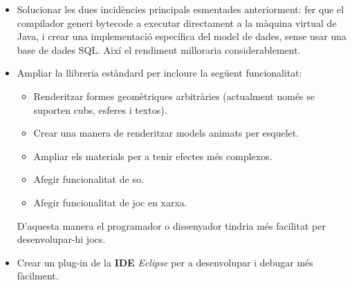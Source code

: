 \begin{itemize}
  \item Solucionar les dues incidències principals esmentades anteriorment: fer que el compilador generi bytecode a executar directament a la màquina virtual de Java, i crear una implementació específica del model de dades, sense usar una base de dades SQL. Així el rendiment milloraria considerablement.
  \item Ampliar la llibreria estàndard per incloure la següent funcionalitat:
  \begin{itemize}
    \item Renderitzar formes geomètriques arbitràries (actualment només se suporten cubs, esferes i textos).
    \item Crear una manera de renderitzar models animats per esquelet.
    \item Ampliar els materials per a tenir efectes més complexos.
    \item Afegir funcionalitat de so.
    \item Afegir funcionalitat de joc en xarxa.
  \end{itemize}
  D'aquesta manera el programador o dissenyador tindria més facilitat per desenvolupar-hi jocs.
  \item Crear un plug-in de la {\bf IDE} {\em Eclipse} per a desenvolupar i debugar més fàcilment.
\end{itemize}